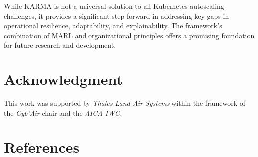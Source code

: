 \documentclass[conference]{IEEEtran}
\begin{document}
While KARMA is not a universal solution to all Kubernetes autoscaling challenges, it provides a significant step forward in addressing key gaps in operational resilience, adaptability, and explainability. The framework's combination of MARL and organizational principles offers a promising foundation for future research and development.

\section*{Acknowledgment}
    This work was supported by \emph{Thales Land Air Systems} within the framework of the \emph{Cyb'Air} chair and the \emph{AICA IWG}.

\section*{References}

\nocite{alDhuraibi2017elasticDocker}

% 



\end{document}
